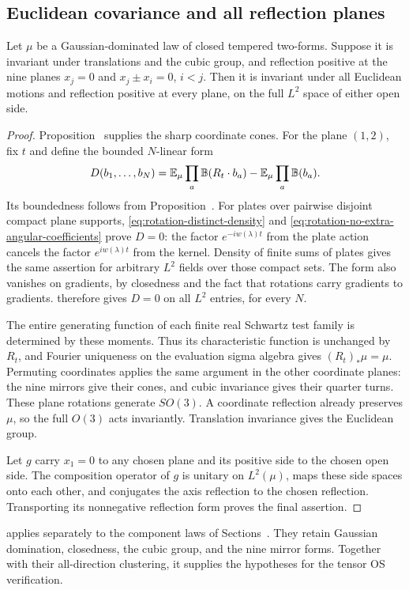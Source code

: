 \subsection{Euclidean covariance and all reflection planes}
\label{subsec:rotation-conclusion}

\begin{theorem}\label{thm:rotation-covariance}
Let $\mu$ be a Gaussian-dominated law of closed tempered two-forms.
Suppose it is invariant under translations and the cubic group,
and reflection positive at the nine planes
$x_j=0$ and $x_j\pm x_i=0$, $i<j$.
Then it is invariant under all Euclidean motions and reflection
positive at every plane, on the full $L^2$ space of either open side.
\end{theorem}

\begin{proof}
Proposition~ supplies the sharp coordinate
cones. For the plane $(1,2)$, fix $t$ and define the bounded
$N$-linear form
\[
 D(b_1,\ldots,b_N)=
 \mathbb E_\mu\prod_a\mathbb B(R_t\cdot b_a)
       -\mathbb E_\mu\prod_a\mathbb B(b_a).
\]
Its boundedness follows from Proposition~.
For plates over pairwise disjoint compact plane supports,
\eqref{eq:rotation-distinct-density} and
\eqref{eq:rotation-no-extra-angular-coefficients} prove $D=0$:
the factor $e^{-iw(\lambda)t}$ from the plate action cancels
the factor $e^{iw(\lambda)t}$ from the kernel.
Density of finite sums of plates gives the same assertion for
arbitrary $L^2$ fields over those compact sets.
The form also vanishes on gradients, by closedness and the
fact that rotations carry gradients to gradients.
 therefore gives $D=0$
on all $L^2$ entries, for every $N$.

The entire generating function of each finite real Schwartz
test family is determined by these moments. Thus its
characteristic function is unchanged by $R_t$, and Fourier
uniqueness on the evaluation sigma algebra gives
$(R_t)_*\mu=\mu$.
Permuting coordinates applies the same argument in the other
coordinate planes: the nine mirrors give their cones, and
cubic invariance gives their quarter turns.
These plane rotations generate $SO(3)$.
A coordinate reflection already preserves $\mu$, so the full
$O(3)$ acts invariantly. Translation invariance gives the
Euclidean group.

Let $g$ carry $x_1=0$ to any chosen plane and its positive side
to the chosen open side. The composition operator of $g$ is
unitary on $L^2(\mu)$, maps these side spaces onto each other,
and conjugates the axis reflection to the chosen reflection.
Transporting its nonnegative reflection form proves the final
assertion.
\end{proof}

 applies separately to the
component laws of Sections~.
They retain Gaussian domination, closedness, the cubic group,
and the nine mirror forms. Together with their all-direction
clustering, it supplies the hypotheses for the tensor OS
verification.



\printbibliography

